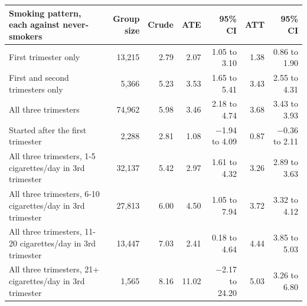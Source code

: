 {\small
\begin{tabular}{lrrrrrr}
\toprule
Smoking pattern, each against never-smokers & Group size & Crude & ATE & 95\% CI & ATT & 95\% CI \\
\midrule
First trimester only & 13,215 & 2.79 & 2.07 & 1.05 to 3.10 & 1.38 & 0.86 to 1.90 \\
First and second trimesters only & 5,366 & 5.23 & 3.53 & 1.65 to 5.41 & 3.43 & 2.55 to 4.31 \\
All three trimesters & 74,962 & 5.98 & 3.46 & 2.18 to 4.74 & 3.68 & 3.43 to 3.93 \\
Started after the first trimester & 2,288 & 2.81 & 1.08 & $-$1.94 to 4.09 & 0.87 & $-$0.36 to 2.11 \\
All three trimesters, 1-5 cigarettes/day in 3rd trimester & 32,137 & 5.42 & 2.97 & 1.61 to 4.32 & 3.26 & 2.89 to 3.63 \\
All three trimesters, 6-10 cigarettes/day in 3rd trimester & 27,813 & 6.00 & 4.50 & 1.05 to 7.94 & 3.72 & 3.32 to 4.12 \\
All three trimesters, 11-20 cigarettes/day in 3rd trimester & 13,447 & 7.03 & 2.41 & 0.18 to 4.64 & 4.44 & 3.85 to 5.03 \\
All three trimesters, 21+ cigarettes/day in 3rd trimester & 1,565 & 8.16 & 11.02 & $-$2.17 to 24.20 & 5.03 & 3.26 to 6.80 \\
\bottomrule
\end{tabular}
}
